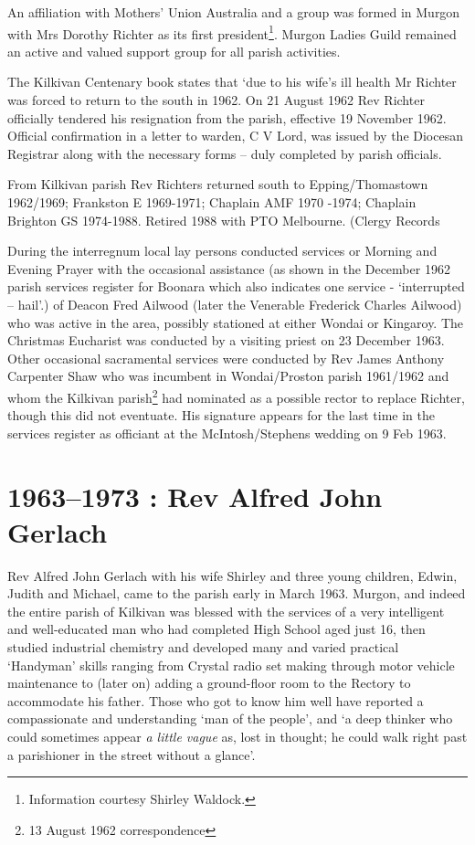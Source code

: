 An affiliation with Mothers' Union Australia and a group was formed in
Murgon with Mrs Dorothy Richter as its first president\footnote{Information
  courtesy Shirley Waldock.}. Murgon Ladies Guild remained an active and
valued support group for all parish activities.

The Kilkivan Centenary book states that `due to his wife's ill health Mr
Richter was forced to return to the south in 1962. On 21 August 1962 Rev
Richter officially tendered his resignation from the parish, effective
19 November 1962. Official confirmation in a letter to warden, C V Lord,
was issued by the Diocesan Registrar along with the necessary forms --
duly completed by parish officials.

From Kilkivan parish Rev Richters returned south to Epping/Thomastown
1962/1969; Frankston E 1969-1971; Chaplain AMF 1970 -1974; Chaplain
Brighton GS 1974-1988. Retired 1988 with PTO Melbourne. (Clergy Records

During the interregnum local lay persons conducted services or Morning
and Evening Prayer with the occasional assistance (as shown in the
December 1962 parish services register for Boonara which also indicates
one service - `interrupted -- hail'.) of Deacon Fred Ailwood (later the
Venerable Frederick Charles Ailwood) who was active in the area,
possibly stationed at either Wondai or Kingaroy. The Christmas Eucharist
was conducted by a visiting priest on 23 December 1963. Other occasional
sacramental services were conducted by Rev James Anthony Carpenter Shaw
who was incumbent in Wondai/Proston parish 1961/1962 and whom the
Kilkivan parish\footnote{13 August 1962 correspondence} had nominated as
a possible rector to replace Richter, though this did not eventuate. His
signature appears for the last time in the services register as
officiant at the McIntosh/Stephens wedding on 9 Feb 1963.

\hypertarget{rev-alfred-john-gerlach}{%
\chapter{1963--1973 : Rev Alfred John
Gerlach}\label{rev-alfred-john-gerlach}}

Rev Alfred John Gerlach with his wife Shirley and three young children,
Edwin, Judith and Michael, came to the parish early in March 1963.
Murgon, and indeed the entire parish of Kilkivan was blessed with the
services of a very intelligent and well-educated man who had completed
High School aged just 16, then studied industrial chemistry and
developed many and varied practical `Handyman' skills ranging from
Crystal radio set making through motor vehicle maintenance to (later on)
adding a ground-floor room to the Rectory to accommodate his father.
Those who got to know him well have reported a compassionate and
understanding `man of the people', and `a deep thinker who could
sometimes appear \emph{a little vague} as, lost in thought; he could
walk right past a parishioner in the street without a glance'.

